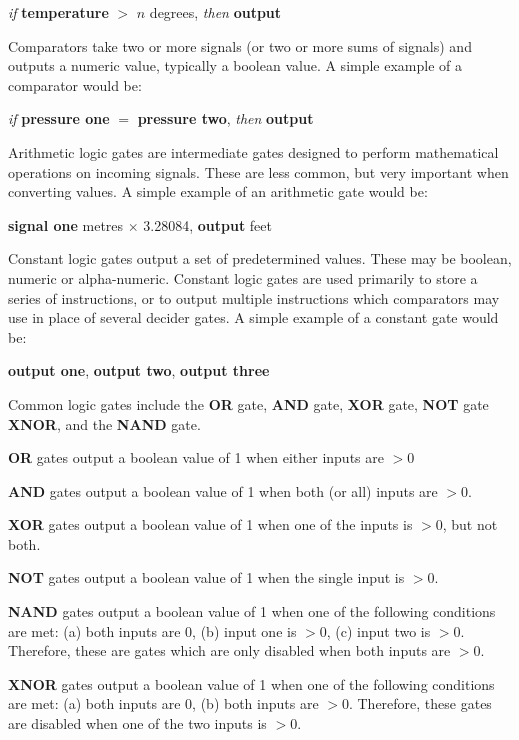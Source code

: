 \documentclass[11pt,a4paper]{article}
\begin{document}
\textit{if} \textbf{temperature} $>$ $n$ degrees, \textit{then} \textbf{output}

Comparators take two or more signals (or two or more sums of signals) and outputs a numeric value, typically a boolean value. A simple example of a comparator would be:

\textit{if} \textbf{pressure one} $=$ \textbf{pressure two}, \textit{then} \textbf{output}

Arithmetic logic gates are intermediate gates designed to perform mathematical operations on incoming signals. These are less common, but very important when converting values. A simple example of an arithmetic gate would be:

\textbf{signal one} metres $\times$ 3.28084, \textbf{output} feet

Constant logic gates output a set of predetermined values. These may be boolean, numeric or alpha-numeric. Constant logic gates are used primarily to store a series of instructions, or to output multiple instructions which comparators may use in place of several decider gates. A simple example of a constant gate would be:

\textbf{output one}, \textbf{output two}, \textbf{output three}

Common logic gates include the \textbf{OR} gate, \textbf{AND} gate, \textbf{XOR} gate, \textbf{NOT} gate \textbf{XNOR}, and the \textbf{NAND} gate.

\textbf{OR} gates output a boolean value of 1 when either inputs are $>0$

\textbf{AND} gates output a boolean value of 1 when both (or all) inputs are $>0$.

\textbf{XOR} gates output a boolean value of 1 when one of the inputs is $>0$, but not both.

\textbf{NOT} gates output a boolean value of 1 when the single input is $>0$.

\textbf{NAND} gates output a boolean value of 1 when one of the following conditions are met: (a) both inputs are 0, (b) input one is $>0$, (c) input two is $>0$. Therefore, these are gates which are only disabled when both inputs are $>0$.

\textbf{XNOR} gates output a boolean value of 1 when one of the following conditions are met: (a) both inputs are 0, (b) both inputs are $>0$. Therefore, these gates are disabled when one of the two inputs is $>0$.
\end{document}
